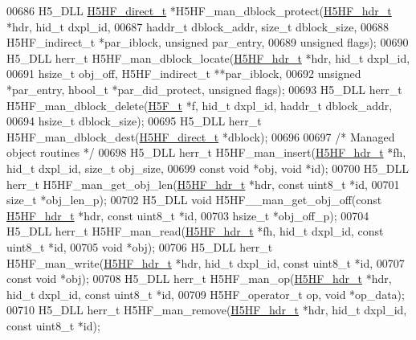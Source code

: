 \begin{DoxyCode}
00686 H5\_DLL \hyperlink{struct_h5_h_f__direct__t}{H5HF\_direct\_t} *H5HF\_man\_dblock\_protect(\hyperlink{struct_h5_h_f__hdr__t}{H5HF\_hdr\_t} *hdr, hid\_t dxpl\_id,
00687     haddr\_t dblock\_addr, \textcolor{keywordtype}{size\_t} dblock\_size,
00688     H5HF\_indirect\_t *par\_iblock, \textcolor{keywordtype}{unsigned} par\_entry,
00689     \textcolor{keywordtype}{unsigned} flags);
00690 H5\_DLL herr\_t H5HF\_man\_dblock\_locate(\hyperlink{struct_h5_h_f__hdr__t}{H5HF\_hdr\_t} *hdr, hid\_t dxpl\_id,
00691     hsize\_t obj\_off, H5HF\_indirect\_t **par\_iblock,
00692     \textcolor{keywordtype}{unsigned} *par\_entry, hbool\_t *par\_did\_protect, \textcolor{keywordtype}{unsigned} flags);
00693 H5\_DLL herr\_t H5HF\_man\_dblock\_delete(\hyperlink{struct_h5_f__t}{H5F\_t} *f, hid\_t dxpl\_id, haddr\_t dblock\_addr,
00694     hsize\_t dblock\_size);
00695 H5\_DLL herr\_t H5HF\_man\_dblock\_dest(\hyperlink{struct_h5_h_f__direct__t}{H5HF\_direct\_t} *dblock);
00696 
00697 \textcolor{comment}{/* Managed object routines */}
00698 H5\_DLL herr\_t H5HF\_man\_insert(\hyperlink{struct_h5_h_f__hdr__t}{H5HF\_hdr\_t} *fh, hid\_t dxpl\_id, \textcolor{keywordtype}{size\_t} obj\_size,
00699     \textcolor{keyword}{const} \textcolor{keywordtype}{void} *obj, \textcolor{keywordtype}{void} *\textcolor{keywordtype}{id});
00700 H5\_DLL herr\_t H5HF\_man\_get\_obj\_len(\hyperlink{struct_h5_h_f__hdr__t}{H5HF\_hdr\_t} *hdr, \textcolor{keyword}{const} uint8\_t *\textcolor{keywordtype}{id},
00701     \textcolor{keywordtype}{size\_t} *obj\_len\_p);
00702 H5\_DLL \textcolor{keywordtype}{void} H5HF\_\_man\_get\_obj\_off(\textcolor{keyword}{const} \hyperlink{struct_h5_h_f__hdr__t}{H5HF\_hdr\_t} *hdr, \textcolor{keyword}{const} uint8\_t *\textcolor{keywordtype}{id},
00703     hsize\_t *obj\_off\_p);
00704 H5\_DLL herr\_t H5HF\_man\_read(\hyperlink{struct_h5_h_f__hdr__t}{H5HF\_hdr\_t} *fh, hid\_t dxpl\_id, \textcolor{keyword}{const} uint8\_t *\textcolor{keywordtype}{id},
00705     \textcolor{keywordtype}{void} *obj);
00706 H5\_DLL herr\_t H5HF\_man\_write(\hyperlink{struct_h5_h_f__hdr__t}{H5HF\_hdr\_t} *hdr, hid\_t dxpl\_id, \textcolor{keyword}{const} uint8\_t *\textcolor{keywordtype}{id},
00707     \textcolor{keyword}{const} \textcolor{keywordtype}{void} *obj);
00708 H5\_DLL herr\_t H5HF\_man\_op(\hyperlink{struct_h5_h_f__hdr__t}{H5HF\_hdr\_t} *hdr, hid\_t dxpl\_id, \textcolor{keyword}{const} uint8\_t *\textcolor{keywordtype}{id},
00709     H5HF\_operator\_t op, \textcolor{keywordtype}{void} *op\_data);
00710 H5\_DLL herr\_t H5HF\_man\_remove(\hyperlink{struct_h5_h_f__hdr__t}{H5HF\_hdr\_t} *hdr, hid\_t dxpl\_id, \textcolor{keyword}{const} uint8\_t *\textcolor{keywordtype}{id});

\end{DoxyCode}
